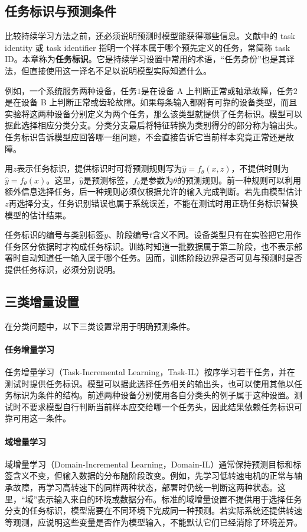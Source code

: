 \subsection{任务标识与预测条件}
比较持续学习方法之前，还必须说明预测时模型能获得哪些信息。文献中的 task identity 或 task identifier 指明一个样本属于哪个预先定义的任务，常简称 task ID。本章称为\textbf{任务标识}。它是持续学习设置中常用的术语，“任务身份”也是其译法，但直接使用这一译名不足以说明模型实际知道什么\cite{delange2022continual}。

例如，一个系统服务两种设备，任务$1$是在设备 A 上判断正常或轴承故障，任务$2$是在设备 B 上判断正常或齿轮故障。如果每条输入都附有可靠的设备类型，而且实验将这两种设备分别定义为两个任务，那么该类型就提供了任务标识。模型可以据此选择相应分类分支。分类分支最后将特征转换为类别得分的部分称为输出头。任务标识告诉模型应回答哪一组问题，不会直接告诉它当前样本究竟正常还是故障。

用$z$表示任务标识，提供标识时可将预测规则写为$\hat y=f_\theta(x,z)$，不提供时则为$\hat y=f_\theta(x)$。这里，$\hat y$是预测标签，$f_\theta$是参数为$\theta$的预测规则。前一种规则可以利用额外信息选择任务，后一种规则必须仅根据允许的输入完成判断。若先由模型估计$z$再选择分支，任务识别错误也属于系统误差，不能在测试时用正确任务标识替换模型的估计结果。

任务标识的编号与类别标签$y$、阶段编号$t$含义不同。设备类型只有在实验把它用作任务区分依据时才构成任务标识。训练时知道一批数据属于第二阶段，也不表示部署时自动知道任一输入属于哪个任务。因而，训练阶段边界是否可见与预测时是否提供任务标识，必须分别说明。

\subsection{三类增量设置}
在分类问题中，以下三类设置常用于明确预测条件\cite{delange2022continual}。

\paragraph{任务增量学习}
任务增量学习（Task-Incremental Learning，Task-IL）按序学习若干任务，并在测试时提供任务标识。模型可以据此选择任务相关的输出头，也可以使用其他以任务标识为条件的结构。前述两种设备分别使用各自分类头的例子属于这种设置。测试时不要求模型自行判断当前样本应交给哪一个任务头，因此结果依赖任务标识可靠可用这一条件。

\paragraph{域增量学习}
域增量学习（Domain-Incremental Learning，Domain-IL）通常保持预测目标和标签含义不变，但输入数据的分布随阶段改变。例如，先学习低转速电机的正常与轴承故障，再学习高转速下的同样两种状态，部署时仍统一判断这两种状态。这里，“域”表示输入来自的环境或数据分布。标准的域增量设置不提供用于选择任务分支的任务标识，模型需要在不同环境下完成同一种预测。若实际系统还提供转速等观测，应说明这些变量是否作为模型输入，不能默认它们已经消除了环境差异。

